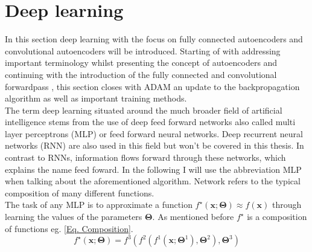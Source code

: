 \documentclass[12pt, a4paper]{article}
\begin{document}
\section{Deep learning}\label{Sec:Deep Learning}
In this section deep learning with the focus on fully connected autoencoders and convolutional autoencoders will be introduced. Starting of with addressing important terminology whilst presenting the concept of autoencoders and continuing with the introduction of the fully connected and convolutional forwardpass , this section closes with ADAM \cite{the} an update to the backpropagation algorithm as well as important training methods.\\ 
The term deep learning situated around the much broader field of artificial intelligence stems from the use of deep feed forward networks also called multi layer perceptrons (MLP) or feed forward neural networks. Deep recurrent neural networks (RNN) are also used in this field but won't be covered in this thesis. In contrast to RNNs, information flows forward through these networks, which explains the name feed foward. In the following I will use the abbreviation MLP when talking about the aforementioned algorithm. Network refers to the typical composition of many different functions.\\The task of any MLP is to approximate a function \(f^\star(\mathbf{x};\mathbf{\Theta}) \approx f(\mathbf{x})\) through learning the values of the parameters \(\mathbf{\Theta}\). As mentioned before  \(f^\star\) is a composition of functions eg. \cref{Eq. Composition}.
\begin{equation}
	 f^\star(\mathbf{x};\mathbf{\Theta})= f^3(f^2(f^1(\mathbf{x};\mathbf{\Theta}^1),\mathbf{\Theta}^2),\mathbf{\Theta}^3)
	 \label{Eq. Composition}
\end{equation}
\end{document}
